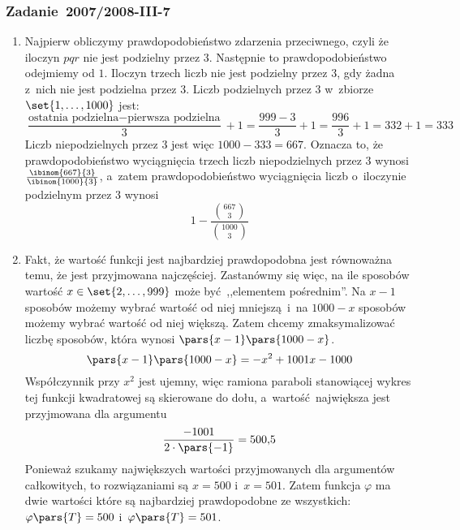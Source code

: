 \subsubsection{Zadanie~2007/2008-III-7}
\begin{enumerate}[label={\alph*)}]
    \item Najpierw obliczymy prawdopodobieństwo zdarzenia przeciwnego, czyli że iloczyn \(pqr\) nie jest podzielny przez \(3\). Następnie to prawdopodobieństwo odejmiemy od \(1\). Iloczyn trzech liczb nie jest podzielny przez \(3\), gdy żadna z~nich nie jest podzielna przez \(3\). Liczb podzielnych przez \(3\) w~zbiorze \(\set{1, \ldots, 1000}\) jest:
        \begin{equation*}
            \frac{\text{ostatnia podzielna} - \text{pierwsza podzielna}}{3} + 1
                = \frac{999 - 3}{3} + 1
                = \frac{996}{3} + 1
                = 332 + 1
                = 333
        \end{equation*}
        Liczb niepodzielnych przez \(3\) jest więc \(1000 - 333 = 667\). Oznacza to, że prawdopodobieństwo wyciągnięcia trzech liczb niepodzielnych przez \(3\) wynosi \(\frac{\ibinom{667}{3}}{\ibinom{1000}{3}}\), a~zatem prawdopodobieństwo wyciągnięcia liczb o~iloczynie podzielnym przez \(3\) wynosi
        \begin{equation*}
            1 - \frac{\binom{667}{3}}{\binom{1000}{3}}
        \end{equation*}
    \item Fakt, że wartość funkcji jest najbardziej prawdopodobna jest równoważna temu, że jest przyjmowana najczęściej. Zastanówmy się więc, na ile sposobów wartość \(x \in \set{2, \ldots, 999}\) może być ,,elementem pośrednim''. Na \(x - 1\) sposobów możemy wybrać wartość od niej mniejszą i~na \(1000 - x\) sposobów możemy wybrać wartość od niej większą. Zatem chcemy zmaksymalizować liczbę sposobów, która wynosi \(\pars{x - 1}\pars{1000 - x}\).
        \begin{equation*}
            \pars{x - 1}\pars{1000 - x} = -x^2 + 1001x - 1000
        \end{equation*}
        Współczynnik przy \(x^2\) jest ujemny, więc ramiona paraboli stanowiącej wykres tej funkcji kwadratowej są skierowane do dołu, a~wartość największa jest przyjmowana dla argumentu
        \begin{equation*}
            \frac{-1001}{2 \cdot \pars{-1}} = 500{,}5
        \end{equation*}
        Ponieważ szukamy największych wartości przyjmowanych dla argumentów całkowitych, to rozwiązaniami są \(x = 500\) i~\(x = 501\). Zatem funkcja \(\varphi\) ma dwie wartości które są najbardziej prawdopodobne ze wszystkich: \(\varphi\pars{T} = 500\) i~\(\varphi\pars{T} = 501\).
\end{enumerate}
